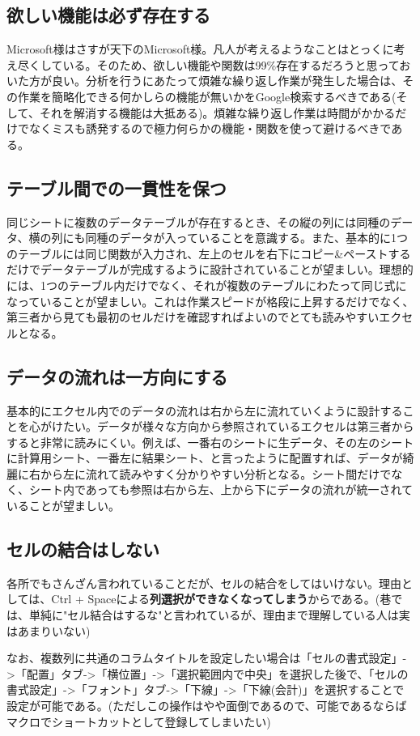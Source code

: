 \documentclass[dvipdfmx]{jsarticle}
\begin{document}
\subsection{欲しい機能は必ず存在する}
Microsoft様はさすが天下のMicrosoft様。凡人が考えるようなことはとっくに考え尽くしている。そのため、欲しい機能や関数は99\%存在するだろうと思っておいた方が良い。分析を行うにあたって煩雑な繰り返し作業が発生した場合は、その作業を簡略化できる何かしらの機能が無いかをGoogle検索するべきである(そして、それを解消する機能は大抵ある)。煩雑な繰り返し作業は時間がかかるだけでなくミスも誘発するので極力何らかの機能・関数を使って避けるべきである。

\subsection{テーブル間での一貫性を保つ}
同じシートに複数のデータテーブルが存在するとき、その縦の列には同種のデータ、横の列にも同種のデータが入っていることを意識する。また、基本的に1つのテーブルには同じ関数が入力され、左上のセルを右下にコピー\&ペーストするだけでデータテーブルが完成するように設計されていることが望ましい。理想的には、1つのテーブル内だけでなく、それが複数のテーブルにわたって同じ式になっていることが望ましい。これは作業スピードが格段に上昇するだけでなく、第三者から見ても最初のセルだけを確認すればよいのでとても読みやすいエクセルとなる。

\subsection{データの流れは一方向にする}
基本的にエクセル内でのデータの流れは右から左に流れていくように設計することを心がけたい。データが様々な方向から参照されているエクセルは第三者からすると非常に読みにくい。例えば、一番右のシートに生データ、その左のシートに計算用シート、一番左に結果シート、と言ったように配置すれば、データが綺麗に右から左に流れて読みやすく分かりやすい分析となる。シート間だけでなく、シート内であっても参照は右から左、上から下にデータの流れが統一されていることが望ましい。

\subsection{セルの結合はしない}
各所でもさんざん言われていることだが、セルの結合をしてはいけない。理由としては、Ctrl + Spaceによる\textbf{列選択ができなくなってしまう}からである。(巷では、単純に"セル結合はするな"と言われているが、理由まで理解している人は実はあまりいない)

なお、複数列に共通のコラムタイトルを設定したい場合は「セルの書式設定」->「配置」タブ->「横位置」->「選択範囲内で中央」を選択した後で、「セルの書式設定」->「フォント」タブ->「下線」->「下線(会計)」を選択することで設定が可能である。(ただしこの操作はやや面倒であるので、可能であるならばマクロでショートカットとして登録してしまいたい)
\end{document}
